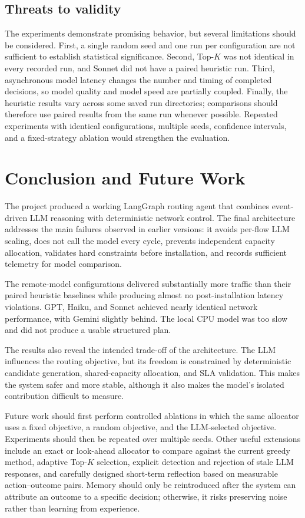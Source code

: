 \subsection{Threats to validity}

The experiments demonstrate promising behavior, but several limitations should be
considered. First, a single random seed and one run per configuration are not sufficient
to establish statistical significance. Second, Top-$K$ was not identical in every
recorded run, and Sonnet did not have a paired heuristic run. Third, asynchronous model
latency changes the number and timing of completed decisions, so model quality and model
speed are partially coupled. Finally, the heuristic results vary across some saved run
directories; comparisons should therefore use paired results from the same run whenever
possible. Repeated experiments with identical configurations, multiple seeds, confidence
intervals, and a fixed-strategy ablation would strengthen the evaluation.


\section*{Conclusion and Future Work}

The project produced a working LangGraph routing agent that combines event-driven LLM
reasoning with deterministic network control. The final architecture addresses the
main failures observed in earlier versions: it avoids per-flow LLM scaling, does not
call the model every cycle, prevents independent capacity allocation, validates hard
constraints before installation, and records sufficient telemetry for model comparison.

The remote-model configurations delivered substantially more traffic than their paired
heuristic baselines while producing almost no post-installation latency violations. GPT,
Haiku, and Sonnet achieved nearly identical network performance, with Gemini slightly
behind. The local CPU model was too slow and did not produce a usable structured plan.

The results also reveal the intended trade-off of the architecture. The LLM influences
the routing objective, but its freedom is constrained by deterministic candidate
generation, shared-capacity allocation, and SLA validation. This makes the system safer
and more stable, although it also makes the model's isolated contribution difficult to
measure.

Future work should first perform controlled ablations in which the same allocator uses
a fixed objective, a random objective, and the LLM-selected objective. Experiments should
then be repeated over multiple seeds. Other useful extensions include an exact or
look-ahead allocator to compare against the current greedy method, adaptive Top-$K$
selection, explicit detection and rejection of stale LLM responses, and carefully
designed short-term reflection based on measurable action--outcome pairs. Memory should
only be reintroduced after the system can attribute an outcome to a specific decision;
otherwise, it risks preserving noise rather than learning from experience.
